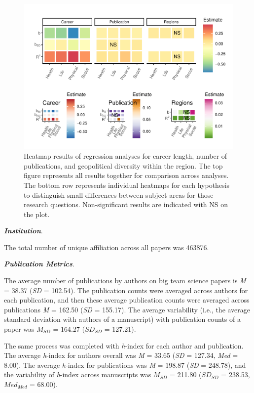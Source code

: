\documentclass[
  man,floatsintext]{apa6}
\begin{document}
\begin{figure}
\centering
\includegraphics{manuscript_scopus_files/figure-latex/fig-heatmap-1.pdf}
\caption{\label{fig:fig-heatmap}Heatmap results of regression analyses for career length, number of publications, and geopolitical diversity within the region. The top figure represents all results together for comparison across analyses. The bottom row represents individual heatmaps for each hypothesis to distinguish small differences between subject areas for those research questions. Non-significant results are indicated with NS on the plot.}
\end{figure}

\textbf{\emph{Institution}}.

The total number of unique affiliation across all papers was 463876.

\textbf{\emph{Publication Metrics}}.

The average number of publications by authors on big team science papers
is \emph{M} = 38.37 (\emph{SD} = 102.54). The
publication counts were averaged across authors for each publication,
and then these average publication counts were averaged across
publications \emph{M} = 162.50 (\emph{SD} =
155.17). The average variability (i.e., the average
standard deviation with authors of a manuscript) with publication counts
of a paper was \(M_{SD}\) = 164.27 (\(SD_{SD}\) =
127.21).

The same process was completed with \emph{h}-index for each author and
publication. The average \emph{h}-index for authors overall was \emph{M} =
33.65 (\emph{SD} = 127.34, \emph{Med} = 8.00). The
average \emph{h}-index for publications was \emph{M} = 198.87 (\emph{SD}
= 248.78), and the variability of \emph{h}-index across
manuscripts was \(M_{SD}\) = 211.80 (\(SD_{SD}\) =
238.53, \(Med_{Med}\) = 68.00).
\end{document}
